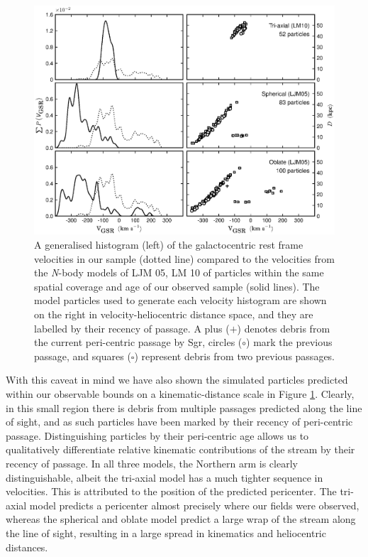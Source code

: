 \documentclass{emulateapj}
\begin{document}
\begin{figure}[t!]
	\centering
	\includegraphics[width=18.4cm]{./figures/lawvelcompare-bw.eps}
	\caption{A generalised histogram (left) of the galactocentric rest frame velocities in our sample (dotted line) compared to the velocities from the \textit{N}-body models of LJM 05, LM 10 of particles within the same spatial coverage and age of our observed sample (solid lines). The model particles used to generate each velocity histogram are shown on the right in velocity-heliocentric distance space, and they are labelled by their recency of passage. A plus ($+$) denotes debris from the current peri-centric passage by Sgr, circles ($\circ$) mark the previous passage, and squares ($\square$) represent debris from two previous passages.}
	\label{fig:law-vel-compare}
\end{figure}


	With this caveat in mind we have also shown the simulated particles predicted within our observable bounds on a kinematic-distance scale in Figure \ref{fig:law-vel-compare}. Clearly, in this small region there is debris from multiple passages predicted along the line of sight, and as such particles have been marked by their recency of peri-centric passage. Distinguishing particles by their peri-centric age allows us to qualitatively differentiate relative kinematic contributions of the stream by their recency of passage.  In all three models, the Northern arm is clearly distinguishable, albeit the tri-axial model has a much tighter sequence in velocities. This is attributed to the position of the predicted pericenter. The tri-axial model predicts a pericenter almost precisely where our fields were observed, whereas the spherical and oblate model predict a large wrap of the stream along the line of sight, resulting in a large spread in kinematics and heliocentric distances.
\end{document}
